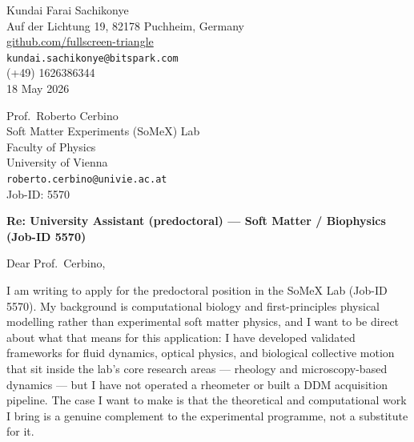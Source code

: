\documentclass[12pt,a4paper]{article}
\begin{document}
\begin{flushright}
Kundai Farai Sachikonye \\
Auf der Lichtung 19, 82178 Puchheim, Germany \\
\href{https://github.com/fullscreen-triangle}{github.com/fullscreen-triangle} \\
\texttt{kundai.sachikonye@bitspark.com} \\
(+49) 1626386344 \\[6pt]
18 May 2026
\end{flushright}

\vspace{1em}

Prof.\ Roberto Cerbino \\
Soft Matter Experiments (SoMeX) Lab \\
Faculty of Physics \\
University of Vienna \\
\texttt{roberto.cerbino@univie.ac.at} \\
Job-ID: 5570

\vspace{1.5em}

\textbf{Re: University Assistant (predoctoral) --- Soft Matter / Biophysics (Job-ID 5570)}

\vspace{1em}

Dear Prof.\ Cerbino,

I am writing to apply for the predoctoral position in the SoMeX Lab (Job-ID 5570).
My background is computational biology and first-principles physical modelling
rather than experimental soft matter physics, and I want to be direct about what
that means for this application: I have developed validated frameworks for fluid
dynamics, optical physics, and biological collective motion that sit inside the
lab's core research areas --- rheology and microscopy-based dynamics --- but I
have not operated a rheometer or built a DDM acquisition pipeline.
The case I want to make is that the theoretical and computational work I bring
is a genuine complement to the experimental programme, not a substitute for it.
\end{document}
